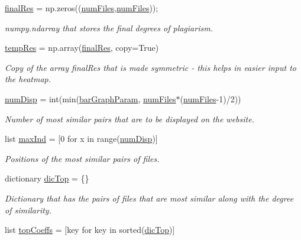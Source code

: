 \begin{DoxyCompactItemize}
\hyperlink{namespacemain_back_a864d25dd2821f3c46a914ace51562000}{final\+Res} = np.\+zeros((\hyperlink{namespacemain_back_a5a0d1ff5b5d2f3a4bec2f88ef04385b3}{num\+Files},\hyperlink{namespacemain_back_a5a0d1ff5b5d2f3a4bec2f88ef04385b3}{num\+Files}));
\begin{DoxyCompactList}\small\item\em numpy.\+ndarray that stores the final degrees of plagiarism. \end{DoxyCompactList}\item 
\hyperlink{namespacemain_back_affa4e447c02fd00737e9a39a8a84a3d1}{temp\+Res} = np.\+array(\hyperlink{namespacemain_back_a864d25dd2821f3c46a914ace51562000}{final\+Res}, copy=True)
\begin{DoxyCompactList}\small\item\em Copy of the array final\+Res that is made symmetric -\/ this helps in easier input to the heatmap. \end{DoxyCompactList}\item 
\hyperlink{namespacemain_back_a0d55fd754fd8cc428c87d89b69beaa7c}{num\+Disp} = int(min(\hyperlink{namespacemain_back_a37d9bf68cddbfd68b167647d790ffe9a}{bar\+Graph\+Param}, \hyperlink{namespacemain_back_a5a0d1ff5b5d2f3a4bec2f88ef04385b3}{num\+Files}$\ast$(\hyperlink{namespacemain_back_a5a0d1ff5b5d2f3a4bec2f88ef04385b3}{num\+Files}-\/1)/2))
\begin{DoxyCompactList}\small\item\em Number of most similar pairs that are to be displayed on the website. \end{DoxyCompactList}\item 
list \hyperlink{namespacemain_back_ad13243d6c872360e7fb0b363e7a1d3ee}{max\+Ind} = \mbox{[}0 for x in range(\hyperlink{namespacemain_back_a0d55fd754fd8cc428c87d89b69beaa7c}{num\+Disp})\mbox{]}
\begin{DoxyCompactList}\small\item\em Positions of the most similar pairs of files. \end{DoxyCompactList}\item 
dictionary \hyperlink{namespacemain_back_a14e7fa3decf3555d9fd28beaae5657fc}{dic\+Top} = \{\}
\begin{DoxyCompactList}\small\item\em Dictionary that has the pairs of files that are most similar along with the degree of similarity. \end{DoxyCompactList}\item 
list \hyperlink{namespacemain_back_a23114ee3f0a053386332a41a4bfc8107}{top\+Coeffs} = \mbox{[}key for key in sorted(\hyperlink{namespacemain_back_a14e7fa3decf3555d9fd28beaae5657fc}{dic\+Top})\mbox{]}

\end{DoxyCompactItemize}
